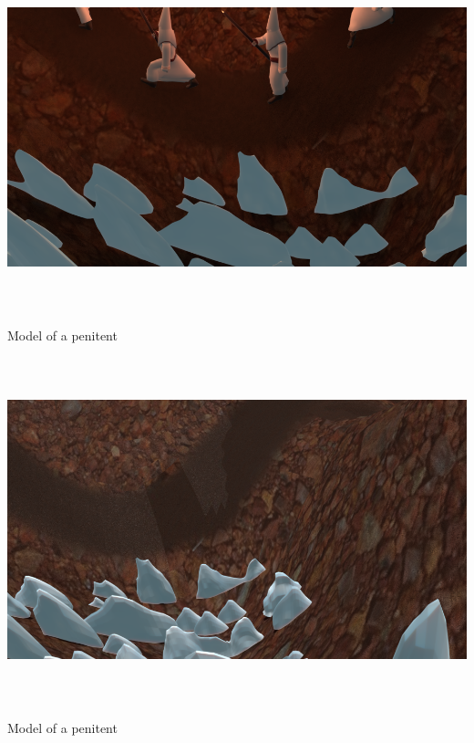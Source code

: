 \documentclass[12pt,a4paper,titlepage,final,tikz,border=4mm]{report}
\begin{document}
\begin {center}
\includegraphics [height = 10cm] {PenitenteAndPenitentes.png}
\caption {Model of a penitent}
\end {center}
\begin {center}
\includegraphics [height = 10cm] {Penitentes.png}
\caption {Model of a penitent}
\end {center}
\end{document}
